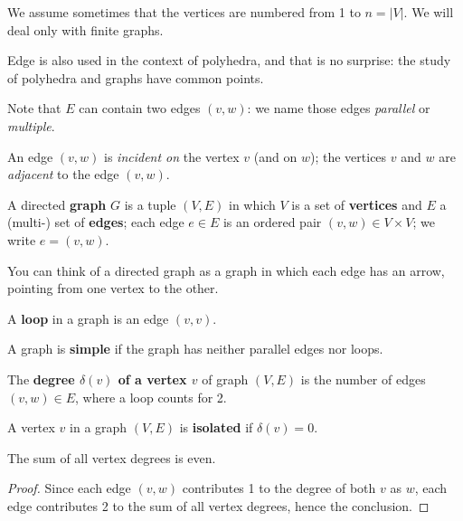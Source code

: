 We assume sometimes that the vertices are numbered from 1 to $n =
|V|$. We will deal only with finite graphs.

Edge is also used in the context of polyhedra, and that is no
surprise: the study of polyhedra and graphs have common points.

Note that $E$ can contain two edges $(v,w)$: we name those edges {\em
parallel} or \emph{multiple}.

An edge $(v,w)$ is {\em incident on} the vertex $v$ (and on $w$);
the vertices $v$ and $w$ are {\em adjacent} to the edge $(v,w)$.

\begin{definition}
A directed \textbf{graph} $G$ is a tuple $(V,E)$ in which
$V$ is a set of \textbf{vertices} and $E$ a (multi-) set
of \textbf{edges}; each edge $e \in E$ is an ordered pair $(v,w) \in
V \times V$; we write $e = (v,w)$.
\end{definition}

You can think of a directed graph as a graph in which each edge has an
arrow, pointing from one vertex to the other.


\begin{definition}[Loop]
  \textup{A \textbf{loop} in a graph is an edge $(v,v)$. }
\end{definition}


\begin{definition}
\textup{A graph is \textbf{simple} if the graph has neither parallel edges
nor loops.}
\end{definition}


\begin{definition}
  \textup{The \textbf{degree $\delta(v)$ of a vertex $v$} of graph
$(V,E)$ is the number of edges $(v,w) \in E$, where a loop counts for 2.}
\end{definition}


\begin{definition}
A vertex $v$ in a graph $(V,E)$ is {\bf isolated} if $\delta(v)=0$.
\end{definition}


\begin{theorem} \label{somgraad}
The sum of all vertex degrees is even.
\end{theorem}
\begin{proof}
Since each edge $(v,w)$ contributes 1 to the degree of both $v$ as
$w$, each edge contributes 2 to the sum of all vertex degrees, hence
the conclusion.
\end{proof}


